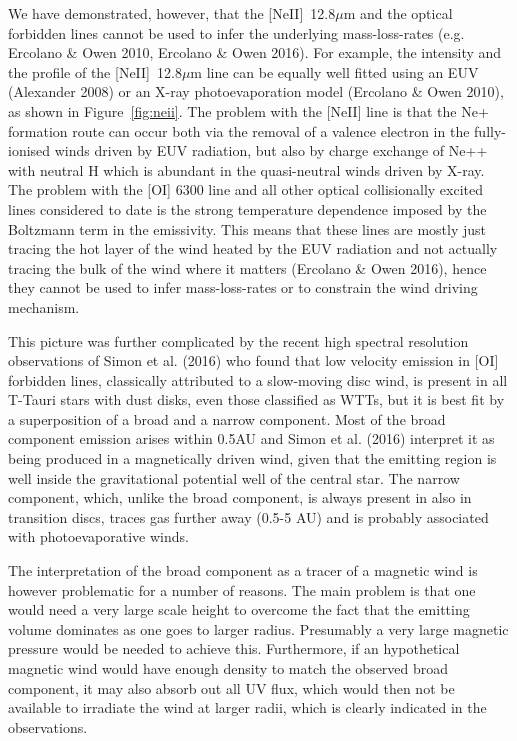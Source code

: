 \documentclass[10pt,fleqn,twoside]{article}
\begin{document}
We have demonstrated, however, that the  [NeII]~12.8$\mu$m and the
optical forbidden lines 
cannot be used to infer the underlying 
mass-loss-rates (e.g. Ercolano \& Owen 2010, Ercolano \& Owen 2016). 
 For example, the intensity and the profile of the [NeII]~12.8$\mu$m line
 can be equally well fitted using an EUV (Alexander 2008) or an X-ray
 photoevaporation model (Ercolano \& Owen 2010), as shown in
 Figure~\ref{fig:neii}. The problem with the 
 [NeII] line is that the Ne+ formation route can occur both via the
 removal of a valence electron in the fully-ionised winds driven by
 EUV radiation, but also by charge exchange of Ne++ with neutral H
 which is abundant in the quasi-neutral winds driven by X-ray. 
The problem with the [OI] 6300 line and all other optical collisionally
excited lines considered to date is the strong temperature dependence
imposed by the Boltzmann term in the emissivity. This means that these
lines are mostly just tracing the hot layer of the wind heated by the
EUV radiation and not actually tracing the bulk of the wind where it
matters (Ercolano \& Owen 2016), hence they
cannot be used to infer mass-loss-rates or to constrain the wind
driving mechanism.   

This picture was further complicated by the recent high spectral
resolution observations of  Simon et al. (2016)  who found that low velocity
emission in [OI] forbidden lines, classically attributed to a
slow-moving disc wind, is present in all T-Tauri stars with
dust disks, even those classified as WTTs, but it is best fit
by a superposition of a broad and a narrow component. 
Most of the broad component emission
arises within 0.5AU and Simon et al. (2016) interpret it
as being produced in a magnetically driven wind, given that the
emitting region is well inside the gravitational 
potential well 
of the central star. The narrow component, which, unlike the broad
component, is always present in also in transition
discs, traces gas further away (0.5-5 AU) and is probably associated
with photoevaporative winds.

The interpretation of the broad component as a tracer of a magnetic
wind is however problematic for a number of reasons. The main problem
is that one would need a very large scale height to overcome the fact
that the emitting volume dominates as one goes to larger
radius. Presumably a very large magnetic pressure would be needed to
achieve this. Furthermore, if an hypothetical magnetic wind would
have enough density to match the observed broad component, it may also absorb
out all UV flux, which would then not be available to irradiate the
wind at larger radii, which is clearly indicated in the
observations. 
\end{document}
